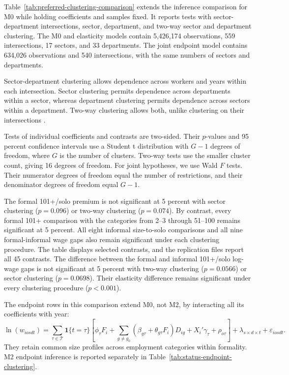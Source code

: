 Table~\ref{tab:preferred-clustering-comparison} extends the inference
comparison for M0 while holding coefficients and samples fixed. It reports tests
with sector-department intersections, sector, department, and two-way sector
and department clustering. The M0 and elasticity models contain
5,426,174 observations, 559 intersections, 17 sectors, and 33 departments.
The joint endpoint model contains 634,026 observations and 540 intersections,
with the same numbers of sectors and departments.

Sector-department clustering allows dependence across workers and years
within each intersection. Sector clustering permits dependence across
departments within a sector, whereas department clustering permits dependence
across sectors within a department. Two-way clustering allows both, unlike
clustering on their intersections \citep{CameronMiller2015}.

Tests of individual coefficients and contrasts are two-sided. Their
\(p\)-values and 95 percent confidence intervals use a Student t distribution
with \(G-1\) degrees of freedom, where \(G\) is the number of clusters.
Two-way tests use the smaller cluster count, giving 16 degrees of freedom.
For joint hypotheses, we use Wald \(F\) tests. Their numerator degrees of
freedom equal the number of restrictions, and their denominator degrees of
freedom equal \(G-1\).

The formal 101+/solo premium is not significant at 5 percent with sector
clustering (\(p=0.096\)) or two-way clustering (\(p=0.074\)). By
contrast, every formal 101+ comparison with the categories from 2--3 through
51--100 remains significant at 5 percent. All eight informal size-to-solo
comparisons and all nine formal-informal wage gaps also remain significant
under each clustering procedure. The table displays selected contrasts,
and the replication files report all 45 contrasts. The difference between
the formal and informal 101+/solo log-wage gaps is not significant at 5 percent
with two-way clustering (\(p=0.0566\)) or sector clustering
(\(p=0.0698\)). Their elasticity difference remains significant under
every clustering procedure (\(p<0.001\)).

The endpoint rows in this comparison extend M0, not M2, by interacting all
its coefficients with year:
\begin{equation}\label{eq:benchmark-dynamics}
 \ln(w_{iosdt}) =
 \sum_{\tau\in\mathcal T}\mathbf{1}\{t=\tau\}
 \left[\phi_\tau F_i+\sum_{g\ne g_0}(\beta_{g\tau}+\theta_{g\tau}F_i)D_{ig}
       +X_i'\gamma_\tau+\rho_{o\tau}\right]
 +\lambda_{s\times d\times t}+\varepsilon_{iosdt}.
\end{equation}
They retain common size profiles across employment categories within
formality. M2 endpoint inference is reported separately in
Table~\ref{tab:status-endpoint-clustering}.

